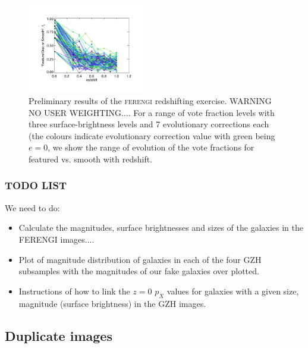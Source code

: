 \documentclass[usenatbib]{mn2e}
\newcommand{\ferengi}{\textsc{ferengi}}
\begin{document}
\begin{figure}
\begin{center}

\includegraphics[width=0.45\textwidth]{figures/somewhat_fake_results.pdf}

\caption{Preliminary results of the \ferengi{} redshifting exercise. WARNING NO USER WEIGHTING.... For a range of vote fraction levels with three surface-brightness levels and 7 evolutionary corrections each (the colours indicate evolutionary correction value with green being $e=0$, we show the range of evolution of the vote fractions for featured vs. smooth with redshift.}

\label{fig:ferengi_results_fake}

\end{center}
\end{figure}


\subsubsection{TODO LIST}
We need to do: 
\begin{itemize}
\item Calculate the magnitudes, surface brightnesses and sizes of the galaxies in the FERENGI images....
\item Plot of magnitude distribution of galaxies in each of the four GZH subsamples with the magnitudes of our fake galaxies over plotted. 
\item Instructions of how to link the $z=0$ $p_X$ values for galaxies with a given size, magnitude (surface brightness) in the GZH images. 
\end{itemize}

\subsection{Duplicate images}
\end{document}
